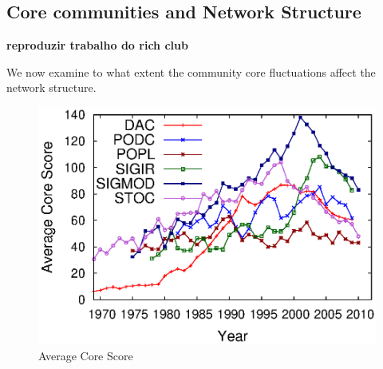 \subsection{Core communities and Network Structure}
\label{sub:corr}


{\bf reproduzir trabalho do rich club \cite{Xu:2010}}

We now examine to what extent the community core fluctuations affect the network structure.

\begin{figure}[!htb]
\centering
\includegraphics[scale=.5]{graficos/average_core_score/average_core_score_slide_window_grupo_temporal_web.eps}
\caption{Average Core Score}
\label{fig:average_core_score}
\end{figure}






